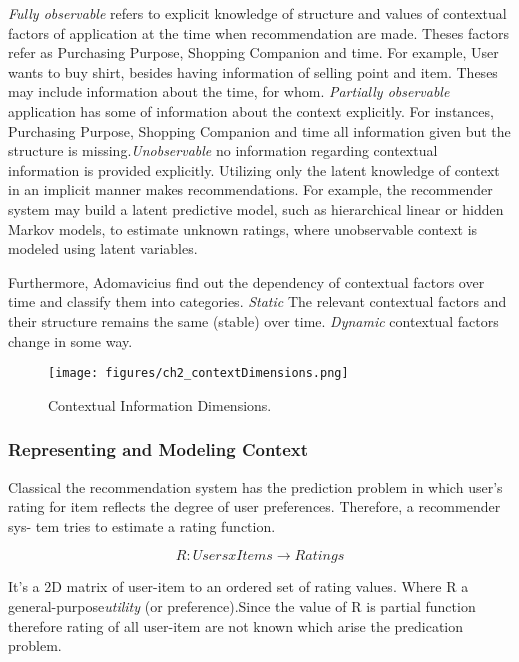 \textit{Fully observable} refers to explicit knowledge of structure and values of contextual factors of application at the time when recommendation are made. Theses factors refer as Purchasing Purpose, Shopping Companion and time. For example, User wants to buy shirt, besides having information of selling point and item. Theses may include information about the time, for whom. \textit{Partially observable} application has some of information about the context explicitly. For instances, Purchasing Purpose, Shopping Companion and time all information given but the structure is missing.\textit{Unobservable} no information regarding contextual information is provided explicitly. Utilizing only the latent knowledge of context in an implicit manner makes recommendations. For example, the recommender system may build a latent predictive model, such as hierarchical linear or hidden Markov models, to estimate unknown ratings, where unobservable context is modeled using latent variables.\newline

Furthermore, Adomavicius \cite[Adomavicius, 2011]{adomavicius2011context} find out the dependency of contextual factors over time and classify them into categories. \textit{Static } The relevant contextual factors and their structure remains the same (stable) over time. \textit{Dynamic} contextual factors change in some way.

\begin{figure}[h]
	\centering
	\texttt{[image: figures/ch2\_contextDimensions.png]}
	\caption{Contextual Information Dimensions.} 
	\cite[Adomavicius, 2011]{adomavicius2011context}
	\label{fig:ch2_contextDimensions}
\end{figure}

\subsubsection{Representing and Modeling Context}

Classical the recommendation system has the prediction problem in which user’s rating for item reflects the degree of user preferences. Therefore, a recommender sys- tem tries to estimate a rating function.\newline

\begin{equation} 
R : Users x Items \rightarrow Ratings
\end{equation}

It’s a 2D matrix of user-item to an ordered set of rating values. Where R a general-purpose\textit{utility} (or preference).Since the value of R is partial function therefore rating of all user-item are not known which arise the predication problem.

